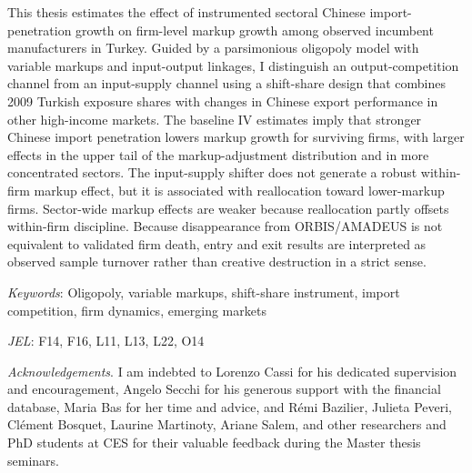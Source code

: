 \documentclass[12pt]{article}
\begin{document}
\begin{titlepage}
\begin{center}
\begin{minipage}{0.94\textwidth}
This thesis estimates the effect of instrumented sectoral Chinese import-penetration growth on firm-level markup growth among observed incumbent manufacturers in Turkey. Guided by a parsimonious oligopoly model with variable markups and input-output linkages, I distinguish an output-competition channel from an input-supply channel using a shift-share design that combines 2009 Turkish exposure shares with changes in Chinese export performance in other high-income markets. The baseline IV estimates imply that stronger Chinese import penetration lowers markup growth for surviving firms, with larger effects in the upper tail of the markup-adjustment distribution and in more concentrated sectors. The input-supply shifter does not generate a robust within-firm markup effect, but it is associated with reallocation toward lower-markup firms. Sector-wide markup effects are weaker because reallocation partly offsets within-firm discipline. Because disappearance from ORBIS/AMADEUS is not equivalent to validated firm death, entry and exit results are interpreted as observed sample turnover rather than creative destruction in a strict sense.

\smallskip
\textit{Keywords}: Oligopoly, variable markups, shift-share instrument, import competition, firm dynamics, emerging markets

\smallskip
\textit{JEL}: F14, F16, L11, L13, L22, O14
\end{minipage}
\end{center}
\endgroup

\vspace{0.3cm}

\begingroup
\footnotesize
{}
\noindent\hspace*{0.04\textwidth}\begin{minipage}{0.92\textwidth}
\textit{Acknowledgements}. I am indebted to Lorenzo Cassi for his dedicated supervision and encouragement, Angelo Secchi for his generous support with the financial database, Maria Bas for her time and advice, and R\'{e}mi Bazilier, Julieta Peveri, Cl\'{e}ment Bosquet, Laurine Martinoty, Ariane Salem, and other researchers and PhD students at CES for their valuable feedback during the Master thesis seminars.
\end{minipage}
\endgroup
\end{titlepage}
\end{document}
